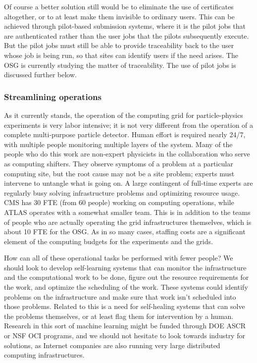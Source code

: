 Of course a better solution still would be to eliminate the use of certificates altogether, or to at least make them invisible to ordinary users.  This can be achieved through pilot-based submission systems, where it is the pilot jobs that are authenticated rather than the user jobs that the pilots subsequently execute.  But the pilot jobs must still be able to provide traceability back to the user whose job is being run, so that sites can identify users if the need arises.  The OSG is currently studying the matter of traceability.  The use of pilot jobs is discussed further below.

\subsubsection{Streamlining operations}

As it currently stands, the operation of the computing grid for particle-physics experiments is very labor intensive; it is not very different from the operation of a complete multi-purpose particle detector.  Human effort is required nearly 24/7, with multiple people monitoring multiple layers of the system.  Many of the people who do this work are non-expert physicists in the collaboration who serve as computing shifters.  They observe symptoms of a problem at a particular computing site, but the root cause may not be a site problem; experts must intervene to untangle what is going on.  A large contingent of full-time experts are regularly busy solving infrastructure problems and optimizing resource usage.  CMS has 30 FTE (from 60 people) working on computing operations, while ATLAS operates with a somewhat smaller team. This is in addition to the teams of people who are actually operating the grid infrastructures themselves, which is about 10 FTE for the OSG.  As in so many cases, staffing costs are a significant element of the computing budgets for the experiments and the grids.

How can all of these operational tasks be performed with fewer people?  We should look to develop self-learning systems that can monitor the infrastructure and the computational work to be done, figure out the resource requirements for the work, and optimize the scheduling of the work.  These systems could identify problems on the infrastructure and make sure that work isn't scheduled into those problems.  Related to this is a need for self-healing systems that can solve the problems themselves, or at least flag them for intervention by a human.  Research in this sort of machine learning might be funded through DOE ASCR or NSF OCI programs, and we should not hesitate to look towards industry for solutions, as Internet companies are also running very large distributed computing infrastructures.

